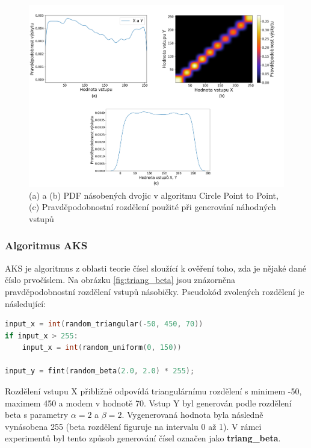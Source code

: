 \begin{figure}[H]
    \centering
    \includegraphics[width=\textwidth]{obrazky-figures/same_uni.png}
    \caption{(a) a (b) PDF násobených dvojic v algoritmu Circle Point to Point, (c) Pravděpodobnostní rozdělení použité při generování náhodných vstupů}
    \label{fig:same_uni}
\end{figure}

\pagebreak

\subsubsection{Algoritmus AKS}
AKS je algoritmus z oblasti teorie čísel sloužící k ověření toho, zda je nějaké dané číslo prvočíslem. Na obrázku \ref{fig:triang_beta} jsou znázorněna pravděpodobnostní rozdělení vstupů násobičky. Pseudokód zvolených rozdělení je následující:

\begin{lstlisting}[language={C}, label={lst:aks}]
input_x = int(random_triangular(-50, 450, 70))
if input_x > 255:
    input_x = int(random_uniform(0, 150))

input_y = fint(random_beta(2.0, 2.0) * 255);
\end{lstlisting}

Rozdělení vstupu X přibližně odpovídá triangulárnímu rozdělení s minimem -50, maximem 450 a modem v hodnotě 70. Vstup Y byl generován podle rozdělení beta s parametry $\alpha = 2$ a $\beta = 2$. Vygenerovaná hodnota byla následně vynásobena 255 (beta rozdělení figuruje na intervalu 0 až 1). V rámci experimentů byl tento způsob generování čísel označen jako \textbf{triang\_beta}.

